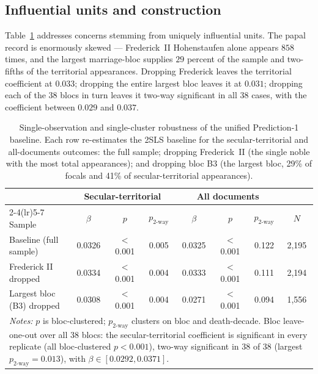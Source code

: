\documentclass[12pt]{article}
\theoremstyle{definition}
\theoremstyle{remark}
\begin{document}
\subsection{Influential units and construction}

Table~\ref{tab:app_robust} addresses concerns stemming from uniquely influential units. The papal record is enormously skewed --- Frederick~II Hohenstaufen alone appears $858$ times, and the largest marriage-bloc supplies $29$ percent of the sample and two-fifths of the territorial appearances. Dropping Frederick leaves the territorial coefficient at $0.033$; dropping the entire largest bloc leaves it at $0.031$; dropping each of the $38$ blocs in turn leaves it two-way significant in all $38$ cases, with the coefficient between $0.029$ and $0.037$.


\begin{table}[t]
\centering
\caption{Single-observation and single-cluster robustness of the unified Prediction-1 baseline. Each row re-estimates the 2SLS baseline for the secular-territorial and all-documents outcomes: the full sample; dropping Frederick~II (the single noble with the most total appearances); and dropping bloc B3 (the largest bloc, 29\% of focals and 41\% of secular-territorial appearances).}
\label{tab:app_robust}
\begin{tabular}{lccccccc}
\toprule
 & \multicolumn{3}{c}{Secular-territorial} & \multicolumn{3}{c}{All documents} & \\
\cmidrule(lr){2-4}\cmidrule(lr){5-7}
Sample & $\beta$ & $p$ & $p_{\text{2-way}}$ & $\beta$ & $p$ & $p_{\text{2-way}}$ & $N$ \\
\midrule
Baseline (full sample) & 0.0326 & $<$0.001 & 0.005 & 0.0325 & $<$0.001 & 0.122 & 2,195 \\
Frederick II dropped & 0.0334 & $<$0.001 & 0.004 & 0.0333 & $<$0.001 & 0.111 & 2,194 \\
Largest bloc (B3) dropped & 0.0308 & $<$0.001 & 0.004 & 0.0271 & $<$0.001 & 0.094 & 1,556 \\
\midrule
\multicolumn{8}{p{0.9\textwidth}}{\footnotesize \textit{Notes:} $p$ is bloc-clustered; $p_{\text{2-way}}$ clusters on bloc and death-decade. Bloc leave-one-out over all 38 blocs: the secular-territorial coefficient is significant in every replicate (all bloc-clustered $p < 0.001$), two-way significant in 38 of 38 (largest $p_{\text{2-way}} = 0.013$), with $\beta \in [0.0292, 0.0371]$.} \\
\bottomrule
\end{tabular}
\end{table}
\end{document}
